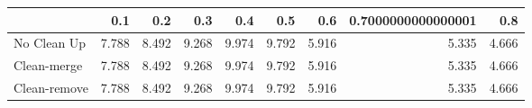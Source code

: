 \begin{tabular}{lrrrrrrrr}
\toprule
{} &   0.1 &   0.2 &   0.3 &   0.4 &   0.5 &   0.6 & 0.7000000000000001 &   0.8 \\
\midrule
No Clean Up  & 7.788 & 8.492 & 9.268 & 9.974 & 9.792 & 5.916 &              5.335 & 4.666 \\
Clean-merge  & 7.788 & 8.492 & 9.268 & 9.974 & 9.792 & 5.916 &              5.335 & 4.666 \\
Clean-remove & 7.788 & 8.492 & 9.268 & 9.974 & 9.792 & 5.916 &              5.335 & 4.666 \\
\bottomrule
\end{tabular}

